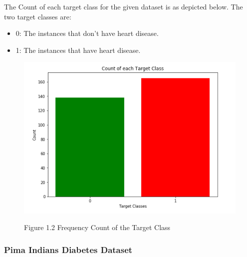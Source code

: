 \documentclass[oneside,12pt]{Classes/VTU}
\begin{document}
    \pagebreak
    The Count of each target class for the given dataset is as depicted below. The two target classes are:
    \begin{itemize}
    	\item 0: The instances that don’t have heart disease.
    	\item 1: The instances that have heart disease.
    \end{itemize}

	\begin{figure}
		\begin{center}
			\includegraphics[scale=0.4]{images/heartcount.png}
		\end{center}
		\begin{center}
			Figure 1.2 Frequency Count of the Target Class
		\end{center}
	\end{figure}
	
	\subsubsection{Pima Indians Diabetes Dataset}
	
\end{document}
